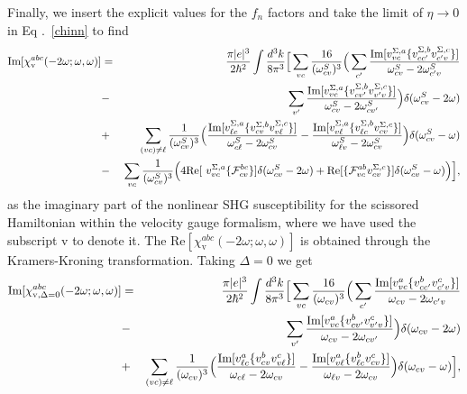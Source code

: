 \documentclass[floatfix,prb,aps,superscriptaddress,11pt]{revtex4}
\begin{document}
Finally, we insert the explicit values for the $f_n$ factors and take the limit of $\eta
\rightarrow 0$ in Eq .~\eqref{chinn} to find 
\begin{eqnarray}
\mbox{Im}\lbrack \chi _{\mathrm{v}}^{abc}(-2\omega;\omega,\omega)] &=&\frac{\pi
|e|^{3}}{2\hbar ^{2}}\int \frac{d^{3}k}{8\pi ^{3}}\Big[\sum_{vc}\frac{16}{(
\omega_{cv}^{S})^{3}}\Big(\sum_{c^{\prime }}\frac{\mbox{Im}\lbrack
v_{vc}^{\Sigma ,a}\{v_{cc^{\prime }}^{\Sigma ,b}v_{c^{\prime }v}^{\Sigma
,c}\}]}{\omega_{cv}^{S}-2\omega_{c^{\prime }v}^{S}}  \notag  \label{imchicf} \\
&-&\sum_{v^{\prime }}\frac{\mbox{Im}\lbrack v_{vc}^{\Sigma
,a}\{v_{cv^{\prime }}^{\Sigma ,b}v_{v^{\prime }v}^{\Sigma ,c}\}]}{\omega
_{cv}^{S}-2\omega_{cv^{\prime }}^{S}}\Big)\delta(\omega_{cv}^{S}-2\omega)  \notag \\
&+&\sum_{(vc)\neq\ell }\frac{1}{(\omega_{cv}^{S})^{3}}\Big(\frac{\mbox{Im}\lbrack
v_{\ell c}^{\Sigma ,a}\{v_{cv}^{\Sigma ,b}v_{v\ell }^{\Sigma ,c}\}]}{\omega
_{c\ell }^{S}-2\omega_{cv}^{S}}-\frac{\mbox{Im}\lbrack v_{v\ell }^{\Sigma
,a}\{v_{\ell c}^{\Sigma ,b}v_{cv}^{\Sigma ,c}\}]}{\omega_{\ell v}^{S}-2\omega
_{cv}^{S}}\Big)\delta(\omega_{cv}^{S}-\omega)  \notag \\
&-&\sum_{vc}\frac{1}{(\omega_{cv}^{S})^{3}}\Big(4\mbox{Re}\lbrack \
v_{vc}^{\Sigma ,a}\{\mathcal{F}_{cv}^{bc}\}]\delta(\omega_{cv}^{S}-2\omega)+\mbox{Re}
\lbrack \{\mathcal{F}_{vc}^{ab}v_{cv}^{\Sigma ,c}\}]\delta(\omega_{cv}^{S}-\omega)
\Big)\Big],
\end{eqnarray}
as the imaginary part of the nonlinear SHG susceptibility for the scissored
Hamiltonian within the velocity gauge formalism, where we have used the
subscript $\mathrm{v}$ to denote it. 
The $\mathrm{Re}[\chi^{abc}_{\mathrm{v}}(-2\omega;\omega,\omega)]$ is
obtained through the Kramers-Kroning transformation.
Taking $\Delta =0$ we get 
\begin{eqnarray}
\mbox{Im}\lbrack \chi _{\mathrm{v},\Delta=0}^{abc}(-2\omega;\omega,\omega)] &=&\frac{\pi
|e|^{3}}{2\hbar ^{2}}\int \frac{d^{3}k}{8\pi ^{3}}\Big[\sum_{vc}\frac{16}{(
\omega_{cv})^{3}}\Big(\sum_{c^{\prime }}\frac{\mbox{Im}\lbrack
v_{vc}^{a}\{v_{cc^{\prime }}^{b}v_{c^{\prime }v}^{c}\}]}{\omega_{cv}-2\omega
_{c^{\prime }v}}  \notag  \label{imchid0} \\
&-&\sum_{v^{\prime }}\frac{\mbox{Im}\lbrack v_{vc}^{a}\{v_{cv^{\prime
}}^{b}v_{v^{\prime }v}^{c}\}]}{\omega_{cv}-2\omega_{cv^{\prime }}}\Big)\delta(\omega
_{cv}-2\omega)  \notag \\
&+&\sum_{(vc)\neq\ell }\frac{1}{(\omega_{cv})^{3}}\Big(\frac{\mbox{Im}\lbrack v_{\ell
c}^{a}\{v_{cv}^{b}v_{v\ell }^{c}\}]}{\omega_{c\ell }-2\omega_{cv}}-\frac{\mbox{Im}
\lbrack v_{v\ell }^{a}\{v_{\ell c}^{b}v_{cv}^{c}\}]}{\omega_{\ell v}-2\omega_{cv}}
\Big)\delta(\omega_{cv}-\omega)\Big],
\end{eqnarray}
\end{document}
